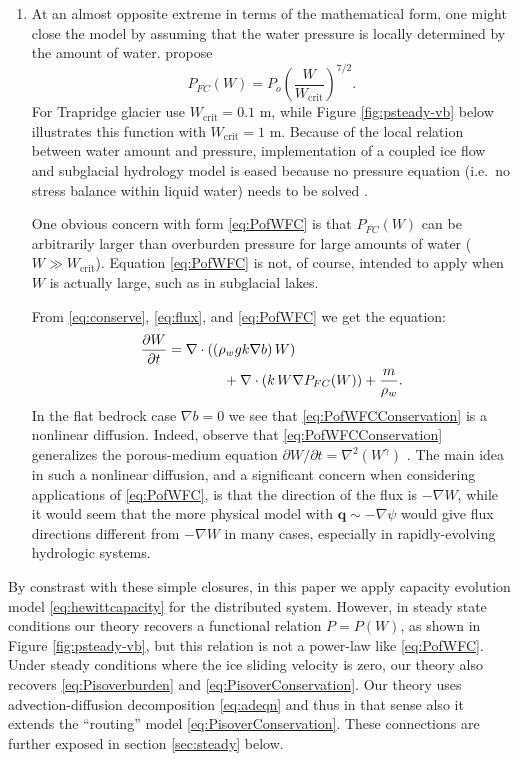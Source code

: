 \documentclass[gmd]{copernicus}   %
\newcommand{\text}{\textrm}
\newcommand\bq{\mathbf{q}}
\newcommand{\Div}{\nabla\cdot}
\newcommand{\grad}{\nabla}
\begin{document}
\begin{enumerate}
\medskip

\item At an almost opposite extreme in terms of the mathematical form, one might close the model by assuming that the water pressure is locally determined by the amount of water.  \cite{FlowersClarke2002_theory} propose
\begin{equation}
P_{FC}(W) = P_o \left(\frac{W}{W_{\text{crit}}}\right)^{7/2}. \label{eq:PofWFC}
\end{equation}
For Trapridge glacier \cite{FlowersClarke2002_trapridge} use $W_{\text{crit}}=0.1$ m, while Figure \ref{fig:psteady-vb} below illustrates this function with $W_{\text{crit}}=1$ m.  Because of the local relation between water amount and pressure, implementation of a coupled ice flow and subglacial hydrology model is eased because no pressure equation (i.e.~no stress balance within liquid water) needs to be solved \citep{PimentelFlowersSchoof2010,PimentelFlowers2011}.

One obvious concern with form \eqref{eq:PofWFC} is that $P_{FC}(W)$ can be arbitrarily larger than overburden pressure for large amounts of water ($W \gg W_{\text{crit}}$).  Equation \eqref{eq:PofWFC} is not, of course, intended to apply when $W$ is actually large, such as in subglacial lakes.

From \eqref{eq:conserve}, \eqref{eq:flux}, and \eqref{eq:PofWFC} we get the equation:
\begin{align}
\frac{\partial W}{\partial t} &= \Div\left((\rho_w g k \grad b)\, W\right)  \label{eq:PofWFCConservation} \\
  &\qquad\qquad + \Div \left(k\,W \grad P_{FC}(W)\right) + \frac{m}{\rho_w}.  \notag
\end{align}
In the flat bedrock case $\grad b=0$ we see that \eqref{eq:PofWFCConservation} is a nonlinear diffusion.  Indeed, \cite{Schoofetal2012} observe that \eqref{eq:PofWFCConservation} generalizes the porous-medium equation $\partial W/\partial t = \grad^2 (W^\gamma)$ \citep{VazquezPME}.  The main idea in such a nonlinear diffusion, and a significant concern when considering applications of \eqref{eq:PofWFC}, is that the direction of the flux is $-\grad W$, while it would seem that the more physical model with $\bq \sim -\grad \psi$ would give flux directions different from $-\grad W$ in many cases, especially in rapidly-evolving hydrologic systems.
\end{enumerate}

\medskip
By constrast with these simple closures, in this paper we apply capacity evolution model \eqref{eq:hewittcapacity} for the distributed system.  However, in steady state conditions our theory recovers a functional relation $P=P(W)$, as shown in Figure \ref{fig:psteady-vb}, but this relation is not a power-law like \eqref{eq:PofWFC}.  Under steady conditions where the ice sliding velocity is zero, our theory also recovers \eqref{eq:Pisoverburden} and \eqref{eq:PisoverConservation}.  Our theory uses advection-diffusion decomposition \eqref{eq:adeqn} and thus in that sense also it extends the ``routing'' model \eqref{eq:PisoverConservation}.  These connections are further exposed in section \ref{sec:steady} below.
\end{document}
